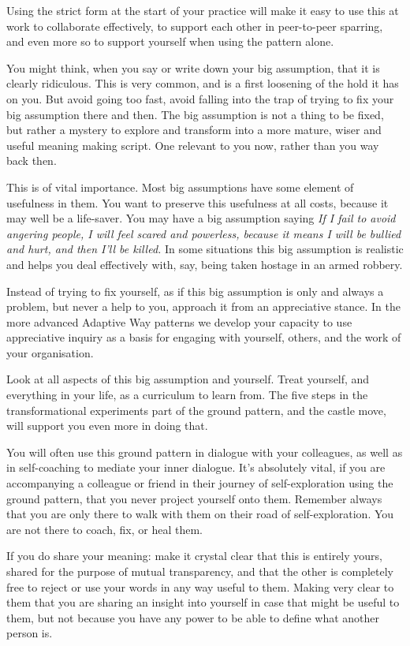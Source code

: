 Using the strict form at the start of your practice will make it easy to use this at work to collaborate effectively, to support each other in peer-to-peer sparring, and even more so to support yourself when using the pattern alone.


You might think, when you say or write down your big assumption, that it is clearly ridiculous. This is very common, and is a first loosening of the hold it has on you. But avoid going too fast, avoid falling into the trap of trying to fix your big assumption there and then. The big assumption is not a thing to be fixed, but rather a mystery to explore and transform into a more mature, wiser and useful meaning making script. One relevant to you now, rather than you way back then.


This is of vital importance. Most big assumptions have some element of usefulness in them. You want to preserve this usefulness at all costs, because it may well be a life-saver. You may have a big assumption saying \emph{If I fail to avoid angering people, I will feel scared and powerless, because it means I will be bullied and hurt, and then I'll be killed.} In some situations this big assumption is realistic and helps you deal effectively with, say, being taken hostage in an armed robbery.


Instead of trying to fix yourself, as if this big assumption is only and always a problem, but never a help to you, approach it from an appreciative stance\cite{cooperrider-ai}. In the more advanced Adaptive Way  patterns we develop your capacity to use appreciative inquiry as a basis for engaging with yourself, others, and the work of your organisation.


Look at all aspects of this big assumption and yourself. Treat yourself, and everything in your life, as a curriculum to learn from. The five steps in the transformational experiments part of the ground pattern, and the castle move, will support you even more in doing that.


You will often use this ground pattern in dialogue with your colleagues, as well as in self-coaching to mediate your inner dialogue. It's absolutely vital, if you are accompanying a colleague or friend in their journey of self-exploration using the ground pattern, that you never project yourself onto them. Remember always that you are only there to walk with them on their road of self-exploration. You are not there to coach, fix, or heal them.


If you do share your meaning: make it crystal clear that this is entirely yours, shared for the purpose of mutual transparency, and that the other is completely free to reject or use your words in any way useful to them. Making very clear to them that you are sharing an insight into yourself in case that might be useful to them, but not because you have any power to be able to define what another person is.


